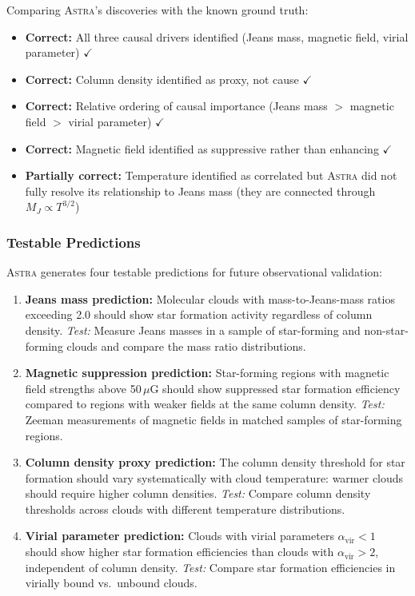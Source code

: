 \documentclass[usenatbib]{rasti}
\newcommand{\astra}{\textsc{Astra}\xspace}
\begin{document}
Comparing \astra's discoveries with the known ground truth:
\begin{itemize}
  \item \textbf{Correct:} All three causal drivers identified (Jeans mass, magnetic field, virial parameter) $\checkmark$
  \item \textbf{Correct:} Column density identified as proxy, not cause $\checkmark$
  \item \textbf{Correct:} Relative ordering of causal importance (Jeans mass $>$ magnetic field $>$ virial parameter) $\checkmark$
  \item \textbf{Correct:} Magnetic field identified as suppressive rather than enhancing $\checkmark$
  \item \textbf{Partially correct:} Temperature identified as correlated but \astra did not fully resolve its relationship to Jeans mass (they are connected through $M_J \propto T^{3/2}$)
\end{itemize}

\subsubsection{Testable Predictions}
\label{sec:tc6:phase6}

\astra generates four testable predictions for future observational validation:
\begin{enumerate}
  \item[(P1)] \textbf{Jeans mass prediction:} Molecular clouds with mass-to-Jeans-mass ratios exceeding 2.0 should show star formation activity regardless of column density. \emph{Test:} Measure Jeans masses in a sample of star-forming and non-star-forming clouds and compare the mass ratio distributions.

  \item[(P2)] \textbf{Magnetic suppression prediction:} Star-forming regions with magnetic field strengths above 50\,$\mu$G should show suppressed star formation efficiency compared to regions with weaker fields at the same column density. \emph{Test:} Zeeman measurements of magnetic fields in matched samples of star-forming regions.

  \item[(P3)] \textbf{Column density proxy prediction:} The column density threshold for star formation should vary systematically with cloud temperature: warmer clouds should require higher column densities. \emph{Test:} Compare column density thresholds across clouds with different temperature distributions.

  \item[(P4)] \textbf{Virial parameter prediction:} Clouds with virial parameters $\alpha_\mathrm{vir} < 1$ should show higher star formation efficiencies than clouds with $\alpha_\mathrm{vir} > 2$, independent of column density. \emph{Test:} Compare star formation efficiencies in virially bound vs.\ unbound clouds.
\end{enumerate}
\end{document}
